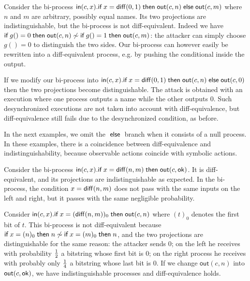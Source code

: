 \newcommand{\In}{\mathsf{in}}
\newcommand{\Out}{\mathsf{out}}

\begin{example}
  Consider the bi-process
  $\In(c,x).\myif x=\diff{0}{1} \mythen \Out(c,n) \myelse \Out(c,m)$
  where $n$ and $m$ are arbitrary, possibly equal names.
  Its two projections are indistinguishable, but the
  bi-process is not diff-equivalent.
  Indeed we have
  $\myif g()=0 \mythen \Out(c,n) \not\sim
  \myif g()=1 \mythen \Out(c,m)$: the attacker can simply choose
  $g()=0$ to distinguish the two sides.
  Our bi-process can however easily be
  rewritten into a diff-equivalent process, e.g. by pushing the conditional
  inside the output.

  If we modify our bi-process into
  $\In(c,x).\myif x=\diff{0}{1} \mythen \Out(c,n) \myelse \Out(c,0)$
  then the two projections become distinguishable.
  The attack is obtained with an execution
  where one process outputs a name while the other outputs $0$. Such
  desynchronized executions are not taken into account with diff-equivalence,
  but diff-equivalence still fails due to the desynchronized condition,
  as before.
\end{example}

In the next examples, we omit the $\;\textsf{else}\;$ branch when it consists of a null
process. In these examples, there is a coincidence between diff-equivalence
and indistinguishability, because observable actions coincide with symbolic
actions.

\begin{example} \label{ex:negl}
  Consider the bi-process
  $\In(c,x).\myif x=\diff{n}{m} \mythen \Out(c,\ok)$.
  It is diff-equivalent, and its projections are
  indistinguishable as expected.
  In the bi-process, the condition $x=\mathsf{diff}(n,m)$ does not pass
  with the same inputs on the left and right, but it passes with
  the same negligible probability.
\end{example}

\begin{example} \label{ex:sync}
  Consider
  $\In(c,x).\myif x=(\diff{n}{m})_0 \mythen \Out(c,n)$
  where $(t)_0$ denotes the first bit of $t$.
  This bi-process is not diff-equivalent because
  $\textsf{if}\; x=(n)_0 \;\textsf{then}\; n \not\sim \textsf{if}\; x=(m)_0 \;\textsf{then}\; n$, and
  the two projections are distinguishable for the same
  reason: the attacker sends $0$;
  on the left he receives with probability $1\over 2$ a bitstring whose
  first bit is $0$;
  on the right process he receives with probably only $1\over 4$
  a bitstring whose last bit is $0$.
  If we change $\Out(c,n)$ into $\Out(c,\ok)$,
  we have indistinguishable processes and diff-equivalence holds.
\end{example}


